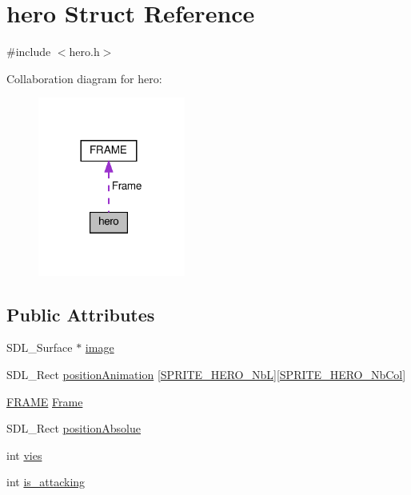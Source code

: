 \hypertarget{structhero}{}\section{hero Struct Reference}
\label{structhero}


{\ttfamily \#include $<$hero.\+h$>$}



Collaboration diagram for hero\+:\nopagebreak
\begin{figure}[H]
\begin{center}
\leavevmode
\includegraphics[width=137pt]{structhero__coll__graph}
\end{center}
\end{figure}
\subsection*{Public Attributes}
\begin{DoxyCompactItemize}
\item 
S\+D\+L\+\_\+\+Surface $\ast$ \hyperlink{structhero_aed2e9c21cff3178bfb3253b278221f5d}{image}
\item 
S\+D\+L\+\_\+\+Rect \hyperlink{structhero_a7e9b84755093a175ee262d43911d267a}{position\+Animation} \mbox{[}\hyperlink{defs_8h_ae70e0edee476cfe7672e361c7883c2c3}{S\+P\+R\+I\+T\+E\+\_\+\+H\+E\+R\+O\+\_\+\+NbL}\mbox{]}\mbox{[}\hyperlink{defs_8h_acef7d9709f30d0ebb21fa325bd27a90d}{S\+P\+R\+I\+T\+E\+\_\+\+H\+E\+R\+O\+\_\+\+Nb\+Col}\mbox{]}
\item 
\hyperlink{structFRAME}{F\+R\+A\+ME} \hyperlink{structhero_a5c0232e4390f7b0a64ab38f2fd0aa09b}{Frame}
\item 
S\+D\+L\+\_\+\+Rect \hyperlink{structhero_abda17b4c734008f7324f196824f0ecaf}{position\+Absolue}
\item 
int \hyperlink{structhero_a3bfdfabb0cc2c40d7144ba899a22bc7b}{vies}
\item 
int \hyperlink{structhero_a550bb6de077fc72e5f8c79ba86ea19ac}{is\+\_\+attacking}
\end{DoxyCompactItemize}


